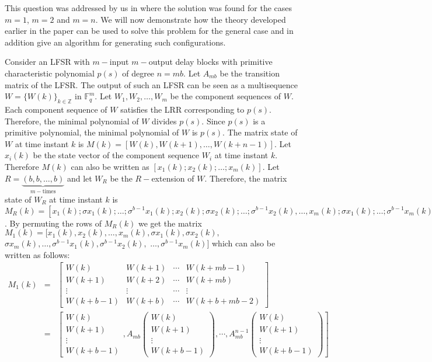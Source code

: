 \documentclass[letterpaper, 12 pt]{article}  \usepackage{amssymb}
\newcommand{\F}{\mathbb{F}}
\begin{document}
This question was addressed by us in \cite{HP} where the solution was found for
the cases $m=1$, $m=2$ and $m=n$. We will now demonstrate how the theory
developed earlier in the paper can be used to solve this problem for the
general case and in addition give an algorithm for generating such
configurations.

Consider an LFSR with $m-$input $m-$output delay blocks with
primitive characteristic polynomial $p(s)$ of degree $n=mb$. Let $A_{mb}$ be
the transition matrix of the LFSR.
The output of such an LFSR can be seen as a
multisequence $W= \{W(k)\}_{k \in \mathbb{Z}}$ in $\F_q^m$. 
Let $W_1,W_2,\ldots,W_m$ be the component sequences of $W$. Each component
sequence of $W$ satisfies the LRR corresponding to $p(s)$. Therefore, the
minimal polynomial of $W$ divides $p(s)$. Since $p(s)$ is a primitive
polynomial, the minimal polynomial of $W$ is $p(s)$. The matrix state of $W$
at time instant $k$ is $M(k) =
[W(k),W(k+1),\ldots,W(k+n-1)]$. Let $x_i(k)$ be the state vector of the
component sequence $W_i$ at time instant $k$. Therefore $M(k)$ can also be
written as $[x_1(k);x_2(k);\ldots;x_m(k)]$. Let $R =
\underbrace{(b,b,\ldots,b)}_{m-\textrm{times}}$ and let $W_R$ be the
$R-$extension of $W$. Therefore, the matrix state of $W_R$ at time instant $k$
is $M_R(k) = [x_1(k);\sigma x_1(k);\ldots;\sigma^{b-1}x_1(k);x_2(k);\sigma
x_2(k);\ldots;\sigma^{b-1}x_2(k),\ldots,x_m(k);\sigma
x_1(k);\ldots;\sigma^{b-1}x_m(k)]$. By permuting the rows of $M_R(k)$ we get the
matrix $M_1(k) = [x_1(k),x_2(k),\ldots,x_m(k),\sigma x_1(k),\sigma x_2(k),$ $
\sigma x_m(k), \ldots, \sigma^{b-1}x_1(k),\sigma^{b-1}x_2(k),$
$\ldots,\sigma^{b-1}x_m(k)]$ which can also be written as follows:
\begin{eqnarray*}
 M_1(k) &=& \left[\begin{matrix}
 W(k) & W({k+1}) & \cdots & W({k+mb-1})\\
 W({k+1}) & W({k+2}) & \cdots & W({k+mb})\\
 \vdots & \vdots & \cdots & \vdots\\
 W({k+b-1}) &  W({k+b}) & \cdots & W({k+b+mb-2})
\end{matrix}\right]\\ &=& 
\left[ \begin{matrix} W({k})\\W({k+1})\\ \vdots
\\W({k+b-1}) \end{matrix},A_{mb}\left(\begin{matrix}
W({k})\\W({k+1})\\ \vdots
\\W({k+b-1}) \end{matrix}\right),\cdots, A_{mb}^{n-1}\left(\begin{matrix}
W({k})\\W({k+1})\\
\vdots
\\W({k+b-1}) \end{matrix}\right)\right]
\end{eqnarray*}
\end{document}
